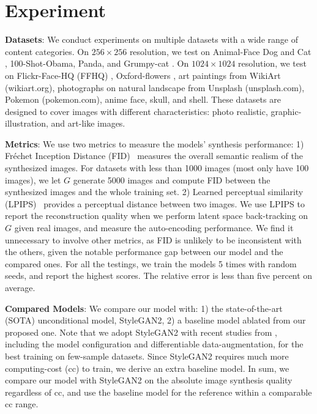 \documentclass{article} \usepackage{iclr2021_conference,times}
\begin{document}
\section{Experiment}

\textbf{Datasets}: We conduct experiments on multiple datasets with a wide range of content categories. On $256\times256$ resolution, we test on Animal-Face Dog and Cat \citep{si2011learning}, 100-Shot-Obama, Panda, and Grumpy-cat \citep{zhao2020differentiable}. On $1024\times1024$ resolution, we test on Flickr-Face-HQ (FFHQ) \citep{karras2019style}, Oxford-flowers \citep{Nilsback06}, art paintings from WikiArt (wikiart.org), photographs on natural landscape from Unsplash (unsplash.com), Pokemon (pokemon.com), anime face, skull, and shell. These datasets are designed to cover images with different characteristics: photo realistic, graphic-illustration, and art-like images.

\textbf{Metrics}: We use two metrics to measure the models' synthesis performance: 1) Fréchet Inception Distance (FID)~\citep{heusel2017gans} measures the overall semantic realism of the synthesized images. For datasets with less than 1000 images (most only have 100 images), we let $G$ generate 5000 images and compute FID between the synthesized images and the whole training set. 2) Learned perceptual similarity (LPIPS)~\citep{zhang2018unreasonable} provides a perceptual distance between two images. We use LPIPS to report the reconstruction quality when we perform latent space back-tracking on $G$ given real images, and measure the auto-encoding performance. We find it unnecessary to involve other metrics, as FID is unlikely to be inconsistent with the others, given the notable performance gap between our model and the compared ones. For all the testings, we train the models 5 times with random seeds, and report the highest scores. The relative error is less than five percent on average.   

\textbf{Compared Models}: We compare our model with: 1) the state-of-the-art (SOTA) unconditional model, StyleGAN2, 2) a baseline model ablated from our proposed one. Note that we adopt StyleGAN2 with recent studies from \citep{karras2020training,zhao2020differentiable}, including the model configuration and differentiable data-augmentation, for the best training on few-sample datasets. Since StyleGAN2 requires much more computing-cost (cc) to train, we derive an extra baseline model. In sum, we compare our model with StyleGAN2 on the absolute image synthesis quality regardless of cc, and use the baseline model for the reference within a comparable cc range.
\end{document}

